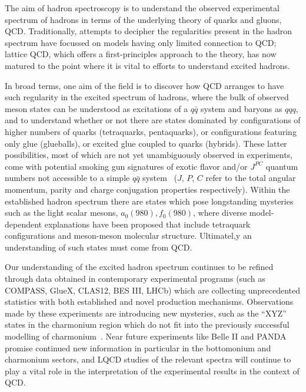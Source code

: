  

The aim of hadron spectroscopy is to understand the observed experimental spectrum of hadrons in terms of the underlying theory of quarks and gluons, QCD. Traditionally, attempts to decipher the regularities present in the hadron spectrum have focussed on models having only limited connection to QCD; lattice QCD, which offers a first-principles approach to the theory, has now matured to the point where it is vital to efforts to understand excited hadrons.

In broad terms, one aim of the field is to discover how QCD arranges to have such regularity in the excited spectrum of hadrons, where the bulk of observed meson states can be understood as excitations of a $q\bar{q}$ system and baryons as $qqq$, and to understand whether or not there are states dominated by configurations of higher numbers of quarks (tetraquarks, pentaquarks), or configurations featuring only glue (glueballs), or excited glue coupled to quarks (hybrids). These latter possibilities, most of which are not yet unambiguously observed in experiments, come with potential smoking gun signatures of exotic flavor and/or $J^{PC}$ quantum numbers not accessible to a simple $q\bar{q}$ system~\cite{Meyer:2015eta} ($J$, $P$, $C$ refer to the total angular momentum, parity and charge conjugation properties respectively). Within the established hadron spectrum there are states which pose longstanding mysteries such as the light scalar mesons, $a_0(980), f_0(980)$, where diverse model-dependent explanations have been proposed that include tetraquark configurations and meson-meson molecular structure. Ultimatel,y an understanding of such states must come from QCD.

Our understanding of the excited hadron spectrum continues to be refined through data obtained in contemporary experimental programs (such as COMPASS, GlueX, CLAS12, BES III, LHCb) which are collecting unprecedented statistics with both established and novel production mechanisms. Observations made by these experiments are introducing new mysteries, such as the ``XYZ'' states in the charmonium region which do not fit into the previously successful modelling of charmonium~\cite{Lebed:2016hpi}. Near future experiments like Belle II and PANDA promise continued new information in particular in the bottomonium and charmonium sectors, and LQCD studies of the relevant spectra will continue to play a vital role in the interpretation of the experimental results in the context of QCD.



